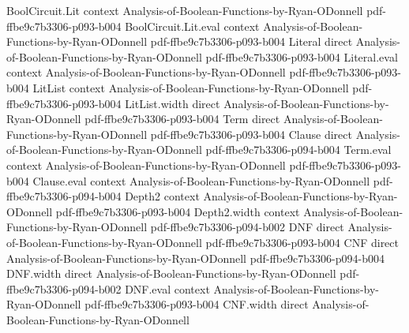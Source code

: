 \begin{lemma}
\leanok
{}
\proofstep
  {BoolCircuit.Lit}
  {context}
  {Analysis-of-Boolean-Functions-by-Ryan-ODonnell}
  {pdf-ffbe9c7b3306-p093-b004}
\proofstep
  {BoolCircuit.Lit.eval}
  {context}
  {Analysis-of-Boolean-Functions-by-Ryan-ODonnell}
  {pdf-ffbe9c7b3306-p093-b004}
\proofstep
  {Literal}
  {direct}
  {Analysis-of-Boolean-Functions-by-Ryan-ODonnell}
  {pdf-ffbe9c7b3306-p093-b004}
\proofstep
  {Literal.eval}
  {context}
  {Analysis-of-Boolean-Functions-by-Ryan-ODonnell}
  {pdf-ffbe9c7b3306-p093-b004}
\proofstep
  {LitList}
  {context}
  {Analysis-of-Boolean-Functions-by-Ryan-ODonnell}
  {pdf-ffbe9c7b3306-p093-b004}
\proofstep
  {LitList.width}
  {direct}
  {Analysis-of-Boolean-Functions-by-Ryan-ODonnell}
  {pdf-ffbe9c7b3306-p093-b004}
\proofstep
  {Term}
  {direct}
  {Analysis-of-Boolean-Functions-by-Ryan-ODonnell}
  {pdf-ffbe9c7b3306-p093-b004}
\proofstep
  {Clause}
  {direct}
  {Analysis-of-Boolean-Functions-by-Ryan-ODonnell}
  {pdf-ffbe9c7b3306-p094-b004}
\proofstep
  {Term.eval}
  {context}
  {Analysis-of-Boolean-Functions-by-Ryan-ODonnell}
  {pdf-ffbe9c7b3306-p093-b004}
\proofstep
  {Clause.eval}
  {context}
  {Analysis-of-Boolean-Functions-by-Ryan-ODonnell}
  {pdf-ffbe9c7b3306-p094-b004}
\proofstep
  {Depth2}
  {context}
  {Analysis-of-Boolean-Functions-by-Ryan-ODonnell}
  {pdf-ffbe9c7b3306-p093-b004}
\proofstep
  {Depth2.width}
  {context}
  {Analysis-of-Boolean-Functions-by-Ryan-ODonnell}
  {pdf-ffbe9c7b3306-p094-b002}
\proofstep
  {DNF}
  {direct}
  {Analysis-of-Boolean-Functions-by-Ryan-ODonnell}
  {pdf-ffbe9c7b3306-p093-b004}
\proofstep
  {CNF}
  {direct}
  {Analysis-of-Boolean-Functions-by-Ryan-ODonnell}
  {pdf-ffbe9c7b3306-p094-b004}
\proofstep
  {DNF.width}
  {direct}
  {Analysis-of-Boolean-Functions-by-Ryan-ODonnell}
  {pdf-ffbe9c7b3306-p094-b002}
\proofstep
  {DNF.eval}
  {context}
  {Analysis-of-Boolean-Functions-by-Ryan-ODonnell}
  {pdf-ffbe9c7b3306-p093-b004}
\proofstep
  {CNF.width}
  {direct}
  {Analysis-of-Boolean-Functions-by-Ryan-ODonnell}

\end{lemma}
